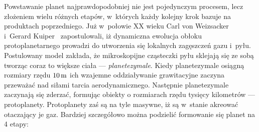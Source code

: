 Powstawanie planet najprawdopodobniej nie jest pojedynczym procesem,
lecz złożeniem wielu różnych etapów, w~których każdy kolejny krok bazuje na
produktach poprzedniego. Już w~połowie XX wieku Carl von
Weizsacker~\cite*{1943ZA.....22..319W} i~Gerard
Kuiper~\cite*{1951PNAS...37....1K} zapostulowali, iż dynamiczna ewolucja obłoku
protoplanetarnego prowadzi do utworzenia się lokalnych zagęszczeń gazu i~py\-łu.
Postulowany model zakłada, że mikroskopijne cząsteczki pyłu sklejają się ze sobą
tworząc coraz to większe ciała --- \emph{planetezymale}. Kiedy planetezymale
osiągną rozmiary rzędu $10\hbox{$\thinspace\textrm{m}$}$ ich wzajemne oddziaływanie grawitacyjne zaczyna
przeważać nad siłami tarcia aerodynamicznego. Następnie planetezymale zaczynają
się zderzać, formując obiekty o rozmiarach rzędu tysięcy kilometrów ---
protoplanety. Protoplanety zaś są na tyle masywne, iż są w~stanie akreować
otaczający je gaz. Bardziej szczegółowo można podzielić formowanie się planet na
4 etapy:


